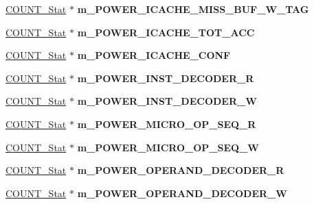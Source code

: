 \begin{DoxyCompactItemize}
\item 
\hypertarget{classall__stats__c_a489b9d270d7b1e8339c2ebcc32c217d1}{
\hyperlink{classCOUNT__Stat}{COUNT\_\-Stat} $\ast$ {\bfseries m\_\-POWER\_\-ICACHE\_\-MISS\_\-BUF\_\-W\_\-TAG}}
\label{classall__stats__c_a489b9d270d7b1e8339c2ebcc32c217d1}

\item 
\hypertarget{classall__stats__c_a7c97f8d584b34fde6a605ac1c9028ba8}{
\hyperlink{classCOUNT__Stat}{COUNT\_\-Stat} $\ast$ {\bfseries m\_\-POWER\_\-ICACHE\_\-TOT\_\-ACC}}
\label{classall__stats__c_a7c97f8d584b34fde6a605ac1c9028ba8}

\item 
\hypertarget{classall__stats__c_a6163a44c6a939b581df6169728799a14}{
\hyperlink{classCOUNT__Stat}{COUNT\_\-Stat} $\ast$ {\bfseries m\_\-POWER\_\-ICACHE\_\-CONF}}
\label{classall__stats__c_a6163a44c6a939b581df6169728799a14}

\item 
\hypertarget{classall__stats__c_a08cbdcebdf5da042449f05c3ea08f675}{
\hyperlink{classCOUNT__Stat}{COUNT\_\-Stat} $\ast$ {\bfseries m\_\-POWER\_\-INST\_\-DECODER\_\-R}}
\label{classall__stats__c_a08cbdcebdf5da042449f05c3ea08f675}

\item 
\hypertarget{classall__stats__c_af6b0b9ec20b909e57b101f8d79fbbfc6}{
\hyperlink{classCOUNT__Stat}{COUNT\_\-Stat} $\ast$ {\bfseries m\_\-POWER\_\-INST\_\-DECODER\_\-W}}
\label{classall__stats__c_af6b0b9ec20b909e57b101f8d79fbbfc6}

\item 
\hypertarget{classall__stats__c_a45c0196daef5e6ed182c2a72e2456cdc}{
\hyperlink{classCOUNT__Stat}{COUNT\_\-Stat} $\ast$ {\bfseries m\_\-POWER\_\-MICRO\_\-OP\_\-SEQ\_\-R}}
\label{classall__stats__c_a45c0196daef5e6ed182c2a72e2456cdc}

\item 
\hypertarget{classall__stats__c_a013623a1ab7472a09013f5905c5f5eec}{
\hyperlink{classCOUNT__Stat}{COUNT\_\-Stat} $\ast$ {\bfseries m\_\-POWER\_\-MICRO\_\-OP\_\-SEQ\_\-W}}
\label{classall__stats__c_a013623a1ab7472a09013f5905c5f5eec}

\item 
\hypertarget{classall__stats__c_a92fb09f4c0e1b17368a382fc04d37d90}{
\hyperlink{classCOUNT__Stat}{COUNT\_\-Stat} $\ast$ {\bfseries m\_\-POWER\_\-OPERAND\_\-DECODER\_\-R}}
\label{classall__stats__c_a92fb09f4c0e1b17368a382fc04d37d90}

\item 
\hypertarget{classall__stats__c_a50e90a1d6d9be30df2d079abe03c5260}{
\hyperlink{classCOUNT__Stat}{COUNT\_\-Stat} $\ast$ {\bfseries m\_\-POWER\_\-OPERAND\_\-DECODER\_\-W}}
\label{classall__stats__c_a50e90a1d6d9be30df2d079abe03c5260}


\end{DoxyCompactItemize}
